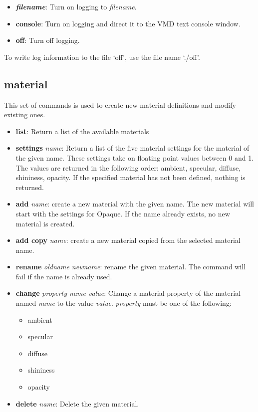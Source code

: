   \begin{itemize}
    \item {\bf {\it filename}}: Turn on logging to {\it filename}.
    \item {\bf console}: Turn on logging and direct it to the VMD 
                         text console window.
    \item {\bf off}: Turn off logging.
  \end{itemize}
  To write log information to the file `off', use the file name `./off'.


\subsection{material}
This set of commands is used to create new material definitions and modify
existing ones.

\begin{itemize}
  \item {\bf list}: Return a list of the available materials
  \item {\bf settings} {\em name}: Return a list of the five material settings
    for the material of the given name.  These settings take on floating point
    values between 0 and 1.  The values are returned in the 
    following order: ambient, specular, diffuse, shininess, opacity.  If the
    specified material has not been defined, nothing is returned.
  \item {\bf add} {\em name}: create a new material with the given name.  
    The new material will start with the settings for {\sf Opaque}.  If 
    the name already exists, no new material is created.
  \item {\bf add copy} {\em name}: create a new material copied from 
    the selected material name.
  \item {\bf rename} {\em oldname newname}: rename the given material.  The
    command will fail if the name is already used.  
  \item {\bf change} {\em property name value}: Change a material property
    of the material named {\em name} to the value {\em value}.  {\em property}
    must be one of the following:
    \begin{itemize}
      \item ambient
      \item specular 
      \item diffuse 
      \item shininess 
      \item opacity 
    \end{itemize}
  \item {\bf delete} {\em name}: Delete the given material.
\end{itemize}
 
